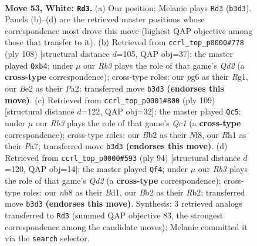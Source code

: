 \documentclass[11pt]{article}
\begin{document}
\clearpage

\begin{figure}[p]\centering
\begin{subfigure}{0.46\textwidth}\centering
\resizebox{\linewidth}{!}{%
\newchessgame
\chessboard[
  setfen={rn1qk2r/4n1b1/6p1/3p2P1/1p1P1P1p/1R5P/1BNQBK2/7R w - - 2 53},
  showmover=false,
  pgfstyle=straightmove, color=movearrow, markmove={b3-d3}
]}
\caption{}
\end{subfigure}\hfill
\begin{subfigure}{0.46\textwidth}\centering
\resizebox{\linewidth}{!}{%
\newchessgame
\chessboard[
  setfen={4q3/2rn1r1k/3p1pp1/1b1P3p/1p1BP2P/p3R1P1/P2Q2BK/6R1 w - - 22 55},
  showmover=false,
  pgfstyle=straightmove, color=movearrow, markmove={d2-b4}
]}
\caption{}
\end{subfigure}
\\[4pt]
\begin{subfigure}{0.46\textwidth}\centering
\resizebox{\linewidth}{!}{%
\newchessgame
\chessboard[
  setfen={2q2n1k/p2bp1rp/Pp1p1p2/1P6/2PNPP2/2QR2P1/4B3/4K3 b - - 16 55},
  showmover=false,
  pgfstyle=straightmove, color=movearrow, markmove={c8-c5}
]}
\caption{}
\end{subfigure}\hfill
\begin{subfigure}{0.46\textwidth}\centering
\resizebox{\linewidth}{!}{%
\newchessgame
\chessboard[
  setfen={6rk/p2qr2n/3p1p2/2pP1P1p/2P5/P4PPp/1R1Q3K/3B2R1 w - - 3 48},
  showmover=false,
  pgfstyle=straightmove, color=movearrow, markmove={d2-f4}
]}
\caption{}
\end{subfigure}
\caption{\textbf{Move 53, White: \texttt{Rd3}.} (a) Our position; Melanie plays \texttt{Rd3} (\texttt{b3d3}). Panels (b)--(d) are the retrieved master positions whose correspondence most drove this move (highest QAP objective among those that transfer to it). (b) Retrieved from \texttt{ccrl\_top\_p0000\#778} (ply 108) [structural distance $d$=105, QAP obj=37]: the master played \texttt{Qxb4}; under $\mu$ our \emph{Rb3} plays the role of that game's \emph{Qd2} (a \textbf{cross-type} correspondence); cross-type roles: our \emph{p}g6 as their \emph{R}g1, our \emph{B}e2 as their \emph{P}a2; transferred move \texttt{b3d3} \textbf{(endorses this move)}. (c) Retrieved from \texttt{ccrl\_top\_p0001\#800} (ply 109) [structural distance $d$=122, QAP obj=32]: the master played \texttt{Qc5}; under $\mu$ our \emph{Rb3} plays the role of that game's \emph{Qc1} (a \textbf{cross-type} correspondence); cross-type roles: our \emph{B}b2 as their \emph{N}f8, our \emph{R}h1 as their \emph{P}a7; transferred move \texttt{b3d3} \textbf{(endorses this move)}. (d) Retrieved from \texttt{ccrl\_top\_p0000\#593} (ply 94) [structural distance $d$=120, QAP obj=14]: the master played \texttt{Qf4}; under $\mu$ our \emph{Rb3} plays the role of that game's \emph{Qd2} (a \textbf{cross-type} correspondence); cross-type roles: our \emph{n}b8 as their \emph{B}d1, our \emph{B}b2 as their \emph{R}b2; transferred move \texttt{b3d3} \textbf{(endorses this move)}. Synthesis: 3 retrieved analogs transferred to \texttt{Rd3} (summed QAP objective 83, the strongest correspondence among the candidate moves); Melanie committed it via the \texttt{search} selector.}
\label{fig:thought-m104}
\end{figure}
\end{document}
